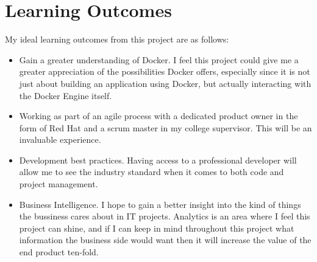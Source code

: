 \documentclass{article}
\begin{document}
\section{Learning Outcomes}
\label{sec:Learning Outcomes}
My ideal learning outcomes from this project are as follows:
\begin{itemize}
	\item Gain a greater understanding of Docker. I feel this project could give me a greater appreciation of the possibilities Docker offers, especially since it is not just about building an application using Docker, but actually interacting with the Docker Engine itself.
	\item Working as part of an agile process with a dedicated product owner in the form of Red Hat and a scrum master in my college supervisor. This will be an invaluable experience.
	\item Development best practices. Having access to a professional developer will allow me to see the industry standard when it comes to both code and project management. 
	\item Business Intelligence. I hope to gain a better insight into the kind of things the bussiness cares about in IT projects. Analytics is an area where I feel this project can shine, and if I can keep in mind throughout this project what information the business side would want then it will increase the value of the end product ten-fold.
\end{itemize}
\end{document}
